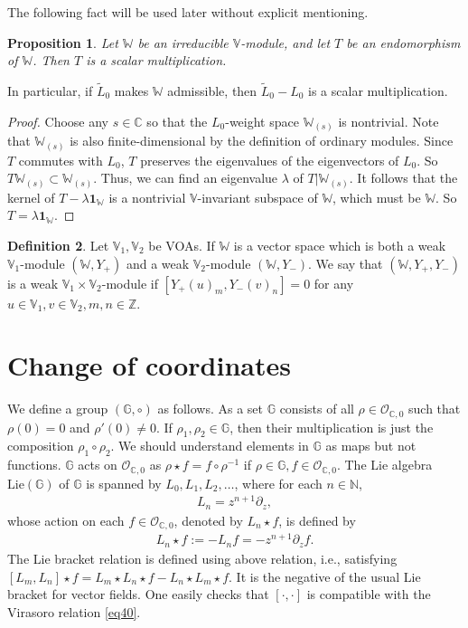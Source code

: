 \documentclass[12pt,a4paper,notitlepage]{report}
\theoremstyle{definition}
\newtheorem{df}{Definition}[section]
\theoremstyle{plain}
\newtheorem{pp}[df]{Proposition}
\newcommand{\wtd}{\widetilde}
\newcommand{\id}{\mathbf{1}}
\newcommand{\scr}{\mathscr}
\newcommand{\Vbb}{\mathbb V}
\newcommand{\Wbb}{\mathbb W}
\newcommand{\Gbb}{\mathbb G}
\newcommand{\Cbb}{\mathbb C}
\newcommand{\Nbb}{\mathbb N}
\newcommand{\Zbb}{\mathbb Z}
\newcommand{\Lie}{\mathrm{Lie}}
\numberwithin{equation}{section}
\begin{document}
The following fact will be used later without explicit mentioning.

\begin{pp}\label{lb131}
Let $\Wbb$ be an irreducible $\Vbb$-module, and let $T$ be an endomorphism of $\Wbb$. Then $T$ is a scalar multiplication. 
\end{pp}
In particular, if  $\wtd L_0$ makes $\Wbb$ admissible, then $\wtd L_0-L_0$ is a scalar multiplication.

\begin{proof}
Choose any $s\in\Cbb$ so that the $L_0$-weight space $\Wbb_{(s)}$ is nontrivial. Note that $\Wbb_{(s)}$ is also finite-dimensional by the definition of ordinary modules. Since $T$ commutes with $L_0$, $T$ preserves the eigenvalues of the eigenvectors of $L_0$. So $T\Wbb_{(s)}\subset\Wbb_{(s)}$. Thus, we can find an eigenvalue $\lambda$ of $T|\Wbb_{(s)}$. It follows that the kernel of $T-\lambda\id_\Wbb$ is a nontrivial $\Vbb$-invariant subspace of $\Wbb$, which must be $\Wbb$. So $T=\lambda\id_\Wbb$.
\end{proof}

\begin{df}\label{lb100}
Let $\Vbb_1,\Vbb_2$ be VOAs. If $\Wbb$ is a vector space which is both a weak $\Vbb_1$-module $(\Wbb,Y_+)$ and a weak $\Vbb_2$-module $(\Wbb,Y_-)$. We say that $(\Wbb,Y_+,Y_-)$ is a weak $\Vbb_1\times\Vbb_2$-module if $[Y_+(u)_m,Y_-(v)_n]=0$ for any $u\in\Vbb_1,v\in\Vbb_2,m,n\in\Zbb$.
\end{df}








\section{Change of coordinates}\label{lb52}



We define a group $(\Gbb,\circ)$ as follows. \index{G@$\Gbb,\Lie(\Gbb)$} As a set $\Gbb$ consists of all $\rho\in\scr O_{\Cbb,0}$ such that $\rho(0)=0$ and $\rho'(0)\neq 0$. If $\rho_1,\rho_2\in\Gbb$, then their multiplication is just the composition $\rho_1\circ\rho_2$. We should understand elements in $\Gbb$ as maps but not functions.  $\Gbb$ acts on $\scr O_{\Cbb,0}$ as $\rho\star f=f\circ \rho^{-1}$ if $\rho\in\Gbb,f\in\scr O_{\Cbb,0}$. The Lie algebra $\Lie(\Gbb)$ of $\Gbb$ is spanned by $L_0,L_1,L_2,\dots$, where for each $n\in\Nbb$, 
\begin{align}
L_n=z^{n+1}\partial_z,\label{eq145}
\end{align}
whose action on each $f\in\scr O_{\Cbb,0}$, denoted by $L_n\star f$, is defined by
\begin{align}
L_n\star f:=-L_nf=-z^{n+1}\partial_zf.\label{eq45}
\end{align}
The Lie bracket relation is defined using above relation, i.e., satisfying $[L_m,L_n]\star f=L_m\star L_n\star f-L_n\star L_m\star f$. It is the negative of the usual Lie bracket for vector fields. One easily checks that $[\cdot,\cdot]$ is compatible with the Virasoro relation \eqref{eq40}.
\end{document}
